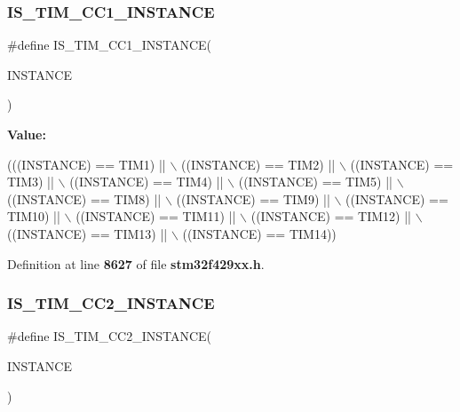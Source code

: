 \subsubsection{I\+S\+\_\+\+T\+I\+M\+\_\+\+C\+C1\+\_\+\+I\+N\+S\+T\+A\+N\+CE}
{\footnotesize\ttfamily \#define I\+S\+\_\+\+T\+I\+M\+\_\+\+C\+C1\+\_\+\+I\+N\+S\+T\+A\+N\+CE(\begin{DoxyParamCaption}\item[{}]{I\+N\+S\+T\+A\+N\+CE }\end{DoxyParamCaption})}

{\bfseries Value\+:}
\begin{DoxyCode}
(((INSTANCE) == TIM1)  || \(\backslash\)
                                         ((INSTANCE) == TIM2)  || \(\backslash\)
                                         ((INSTANCE) == TIM3)  || \(\backslash\)
                                         ((INSTANCE) == TIM4)  || \(\backslash\)
                                         ((INSTANCE) == TIM5)  || \(\backslash\)
                                         ((INSTANCE) == TIM8)  || \(\backslash\)
                                         ((INSTANCE) == TIM9)  || \(\backslash\)
                                         ((INSTANCE) == TIM10) || \(\backslash\)
                                         ((INSTANCE) == TIM11) || \(\backslash\)
                                         ((INSTANCE) == TIM12) || \(\backslash\)
                                         ((INSTANCE) == TIM13) || \(\backslash\)
                                         ((INSTANCE) == TIM14))
\end{DoxyCode}


Definition at line \textbf{ 8627} of file \textbf{ stm32f429xx.\+h}.

\mbox{\label{group__Exported__macros_ga6ef84d278cf917c7e420b94687b39c7c}} 
\subsubsection{I\+S\+\_\+\+T\+I\+M\+\_\+\+C\+C2\+\_\+\+I\+N\+S\+T\+A\+N\+CE}
{\footnotesize\ttfamily \#define I\+S\+\_\+\+T\+I\+M\+\_\+\+C\+C2\+\_\+\+I\+N\+S\+T\+A\+N\+CE(\begin{DoxyParamCaption}\item[{}]{I\+N\+S\+T\+A\+N\+CE }\end{DoxyParamCaption})}

